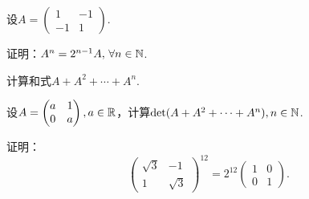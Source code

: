 \begin{problem}
  设$A=\begin{pmatrix}
    1 & -1 \\
    -1 & 1
  \end{pmatrix}$.
  \begin{enum}
    \item 证明：$A^n=2^{n-1}A,\,\forall n\in\mathbb N$.
    \item 计算和式$A+A^2+\cdots+A^n$.
  \end{enum}
\end{problem}

\begin{problem}
  设$A=\begin{pmatrix}
    a & 1 \\
    0 & a
  \end{pmatrix},a\in\mathbb R$，计算$\det(A+A^2+\cdots+A^n),n\in\mathbb N$.
\end{problem}

\begin{problem}
  证明：
  \[
    \begin{pmatrix}
      \sqrt3 & -1 \\
      1 & \sqrt3
    \end{pmatrix} ^{12} = 2^{12}\begin{pmatrix}
      1 & 0 \\
      0 & 1
    \end{pmatrix}.
  \]
\end{problem}

